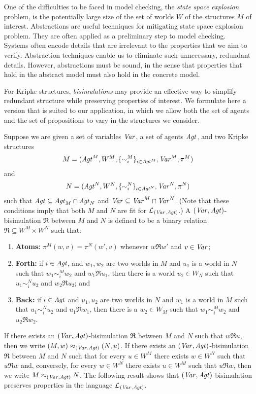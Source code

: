 \documentclass[]{llncs}
\newcommand{\lang}{{\cal L}}
\newcommand{\Agt}{{\it Agt}}
\newcommand{\Var}{{\it Var}}
\begin{document}
One of the difficulties to be faced in model checking, the {\em state space explosion} problem, 
is the potentially large size of the set of worlds $W$ of the structures $M$ of interest. 
Abstractions are useful techniques for mitigating
state space explosion problem. They are often applied 
as a preliminary step to model checking. 
Systems often encode details
that are irrelevant to the properties that we aim
to verify. Abstraction techniques enable us to eliminate such unnecessary,  redundant details. 
However, abstractions must be sound, in the sense that properties that hold in the abstract model must
also hold in the concrete model.

For Kripke structures, {\em bisimulations}
may provide an 
effective way to simplify redundant structure 
while preserving properties of interest. We formulate here a 
version that is suited to our application, in which we allow both the 
set of agents and the set of propositions to vary  in the structures 
we consider. 

Suppose we are given a set of variables $\Var$, a set of agents $\Agt$, 
and two Kripke structures 
$$M = (\Agt^M, W^M, \{\sim^M_i\}_{i\in \Agt^M}, \Var^M, \pi^M)$$  
and  $$N = (\Agt^N, W^N, \{\sim^N_i\}_{i\in \Agt^N}, \Var^N, \pi^N)$$ 
such that $\Agt \subseteq \Agt_M\cap  \Agt_N$ and $\Var \subseteq \Var^M \cap \Var^N$. 
(Note that these conditions imply that both $M$ and $N$ are fit for $\lang_{(\Var,\Agt)}$.) 
A $(\Var,\Agt)$-bisimulation $\Re$ between $M$ and $N$ is defined to be a binary relation
$\Re \subseteq W^M \times W^{N}$ such that:
\begin{enumerate}
\item \textbf{Atoms:} $\pi^{M} (w, v) = \pi^{N} (w', v)$ whenever $w \Re w'$ and $v\in \Var$; 

\item  \textbf{Forth:}  if $i\in \Agt$,  and $w_{1}, w_{2}$ are two worlds in $M$ and $u_{1}$ is a world in $N$
such that $w_{1} \sim^M_{i} w_{2}$ and $w_{1} \Re u_{1}$, then there is
a world  $u_{2} \in W_{N}$ such that $u_{1} \sim^N_{i} u_{2}$
and $ w_{2} \Re u_{2}$; and 
\item \textbf{Back:}  if  $i\in \Agt$ and $u_{1}, u_{2}$ are two worlds in $N$ and $w_{1}$ is a world in $M$
such that $u_{1} \sim^N_{i} u_{2}$ and $u_{1} \Re w_{1}$, then there is
a $w_{2} \in W_{M}$ such that $w_{1} \sim^M_{i} w_{2}$
and $ u_{2} \Re w_{2}$.

\end{enumerate}
If there exists an $(\Var,\Agt)$-bisimulation $\Re$ between $M$ and $N$ such that $w \Re u$,
then we write $(M,w) \approx_{(\Var,\Agt)} (N, u)$. 
If there  exists an $(\Var,\Agt)$-bisimulation $\Re$ between $M$ and $N$ such that 
for every $u\in W^M$ there exists $w\in W^N$ such that $u\Re w$ and, conversely, 
for every $w\in W^N$ there exists $u\in W^M$ such that $u\Re w$,  then we write $M\approx_{(\Var,\Agt)} N$. 
The following result shows that $(\Var,\Agt)$-bisimulation preserves properties in the language $\lang_{(\Var,\Agt)}$. 
\end{document}
